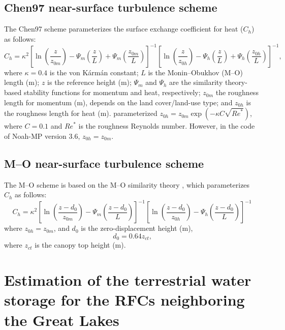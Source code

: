 \documentclass[essd, manuscript]{copernicus}
\begin{document}
\subsection{Chen97 near-surface turbulence scheme}\label{sec:app:noahmp:chen97}

The Chen97 scheme \citep{chen1997BM} parameterizes the surface exchange coefficient for heat (\(C_{h}\)) as follows:
\begin{equation}
  C_{h} = \kappa^{2} \left[ \ln(\frac{z}{z_{0m}})
    - \Psi_{m}(\frac{z}{L})
    + \Psi_{m}(\frac{z_{0m}}{L})\right]^{-1}
  \left[\ln(\frac{z}{z_{0h}})
    - \Psi_{h}(\frac{z}{L})
    + \Psi_{h}(\frac{z_{0h}}{L})\right]^{-1}
  \text{,}
\end{equation}
where \(\kappa=0.4\) is the von Kármán constant; \(L\) is the Monin--Obukhov (M--O) length (m); \(z\) is the reference height (m); \(\Psi_{m}\) and \(\Psi_{h}\) are the similarity theory-based stability functions for momentum and heat, respectively; \(z_{0m}\) the roughness length for momentum (m), depends on the land cover/land-use type; and \(z_{0h}\) is the roughness length for heat (m). \citet{niu2011JGRA} parameterized \(z_{0h} = z_{0m} \exp(-\kappa C \sqrt{{Re}^*})\), where \(C=0.1\) and \({Re}^*\) is the roughness Reynolds number. However, in the code of Noah-MP version 3.6, \(z_{0h} = z_{0m}\).

\subsection{M--O near-surface turbulence scheme}\label{sec:app:noahmp:mo}

The M--O scheme is based on the M--O similarity theory \citep{brutsaert1982}, which parameterizes \(C_h\) as follows:
\begin{equation}
  C_h = \kappa^2 \left[ \ln(\frac{z - d_{0}}{z_{0m}})
    - \Psi_{m}(\frac{z - d_0}{L})\right]^{-1}
  \left[\ln(\frac{z - d_0}{z_{0h}})
    -\Psi_{h}(\frac{z - d_0}{L})\right]^{-1}
\end{equation}
where \(z_{0h} = z_{0m}\), and \(d_0\) is the zero-displacement height (m),
\begin{equation}
  d_0 = 0.64 z_{ct}
  \text{,}
\end{equation}
where \(z_{ct}\) is the canopy top height (m).

\section{Estimation of the terrestrial water storage for the RFCs neighboring the Great Lakes} \label{app:tws}
\end{document}
